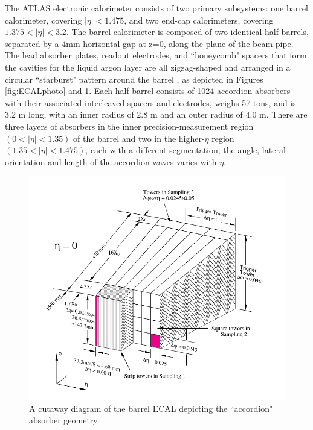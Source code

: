 The ATLAS electronic calorimeter consists of two primary subsystems: one barrel calorimeter, covering $ |\eta |<1.475$, and two end-cap calorimeters, covering $ 1.375<| \eta |< 3.2 $. The barrel calorimeter is composed of two identical half-barrels, separated by a 4mm horizontal gap at z=0, along the plane of the beam pipe. The lead absorber plates, readout electrodes, and ``honeycomb" spacers that form the cavities for the liquid argon layer are all zigzag-shaped and arranged in a circular ``starburst" pattern around the barrel \cite{LAr_TDR}, as depicted in Figures \ref{fig:ECALphoto} and \ref{fig:ECALdiagram}. Each half-barrel consists of 1024 accordion absorbers with their associated interleaved spacers and electrodes, weighs 57 tons, and is 3.2 m long, with an inner radius of 2.8 m and an outer radius of 4.0 m. There are three layers of absorbers in the inner precision-measurement region $(0 <| \eta |< 1.35)$ of the barrel and two in the higher-$\eta$ region $(1.35 < | \eta |<1.475)$, each with a different segmentation; the angle, lateral orientation and length of the accordion waves varies with $\eta$.

\begin{figure}
  \includegraphics[width=\linewidth]{figures/detector_chapter/ECALdiagram.png}
  \caption{A cutaway diagram of the barrel ECAL depicting the ``accordion" absorber geometry \cite{ATLAS_Jinst}}
  \label{fig:ECALdiagram}
\end{figure}

